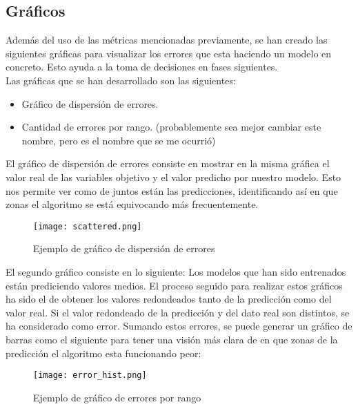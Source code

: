 \subsection{Gráficos}
Además del uso de las métricas mencionadas previamente, se han creado las siguientes gráficas para visualizar los errores que esta haciendo un modelo en concreto. Esto ayuda a la toma de decisiones en fases siguientes.\\
Las gráficas que se han desarrollado son las siguientes:
\begin{itemize}
	\item Gráfico de dispersión de errores.
	\item Cantidad de errores por rango. (probablemente sea mejor cambiar este nombre, pero es el nombre que se me ocurrió)
\end{itemize}
El gráfico de dispersión de errores consiste en mostrar en la misma gráfica el valor real de las variables objetivo y el valor predicho por nuestro modelo. Esto nos permite ver como de juntos están las predicciones, identificando así en que zonas el algoritmo se está equivocando más frecuentemente.\\
\begin{figure}[H]
	\centering
	\texttt{[image: scattered.png]}
	\caption{Ejemplo de gráfico de dispersión de errores}
	\label{fig:scattered_example}
\end{figure}

El segundo gráfico consiste en lo siguiente:
Los modelos que han sido entrenados están prediciendo valores medios. El proceso seguido para realizar estos gráficos ha sido el de obtener los valores redondeados tanto de la predicción como del valor real. Si el valor redondeado de la predicción y del dato real son distintos, se ha considerado como error. Sumando estos errores, se puede generar un gráfico de barras como el siguiente para tener una visión más clara de en que zonas de la predicción el algoritmo esta funcionando peor:
\linebreak
\begin{figure}[H]
	\centering
	\texttt{[image: error\_hist.png]}
	\caption{Ejemplo de gráfico de errores por rango}
	\label{fig:error_hist_example}
\end{figure}
